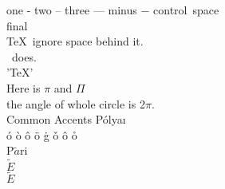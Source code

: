 one - two -- three --- minus $ - $
control\ space\\
final\\
\TeX\ ignore space behind it.\\
\XeTeX\ does.\\
'\TeX'\\
Here is $\pi$ and $\Pi$\\
the angle of whole circle is 2$\pi$.\\

Common Accents
P\'olya\i\\
\'o \`o \^o \"o \.g \v{o} \^{o} \r{o}\\
P$\tilde{a}$ri\\
$\tilde{E}$\\
$\widetilde{E}$\\






